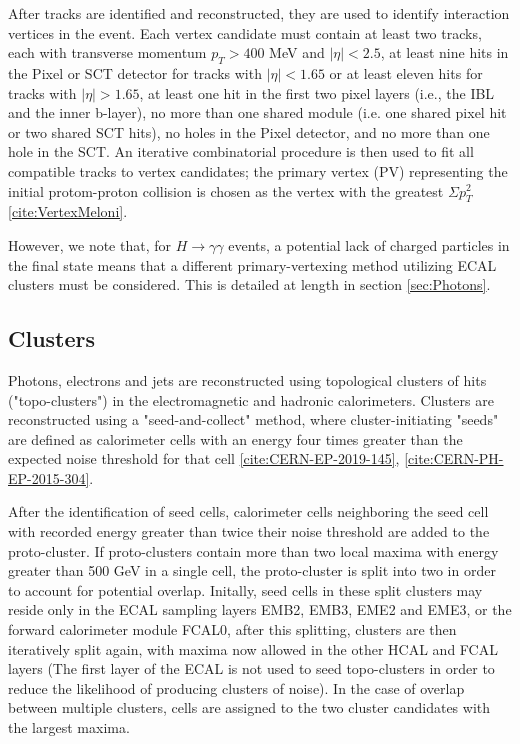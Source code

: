After tracks are identified and reconstructed, they are used to identify interaction vertices in the event. Each vertex candidate must contain at least two tracks, each with transverse momentum $p_{T} > 400$ MeV and $|\eta|<2.5$, at least nine hits in the Pixel or SCT detector for tracks with $|\eta|<1.65$ or at least eleven hits for tracks with $|\eta|>1.65$, at least one hit in the first two pixel layers (i.e., the IBL and the inner b-layer), no more than one shared module (i.e. one shared pixel hit or two shared SCT hits), no holes in the Pixel detector, and no more than one hole in the SCT. An iterative combinatorial procedure is then used to fit all compatible tracks to vertex candidates; the primary vertex (PV) representing the initial protom-proton collision is chosen as the vertex with the greatest $\Sigma p_{T}^{2}$ \ref{cite:VertexMeloni}.

However, we note that, for $H \rightarrow \gamma \gamma$ events, a potential lack of charged particles in the final state means that a different primary-vertexing method utilizing ECAL clusters must be considered. This is detailed at length in section \ref{sec:Photons}.


\subsection{Clusters} \label{sec:Clusters} 

Photons, electrons and jets are reconstructed using topological clusters of hits ("topo-clusters") in the electromagnetic and hadronic calorimeters. Clusters are reconstructed using a "seed-and-collect" method, where cluster-initiating "seeds" are defined as calorimeter cells with an energy four times greater than the expected noise threshold for that cell  \ref{cite:CERN-EP-2019-145}, \ref{cite:CERN-PH-EP-2015-304}.

After the identification of seed cells, calorimeter cells neighboring the seed cell with recorded energy greater than twice their noise threshold are added to the proto-cluster. If proto-clusters contain more than two local maxima with energy greater than 500 GeV in a single cell, the proto-cluster is split into two in order to account for potential overlap. Initally, seed cells in these split clusters may reside only in the ECAL sampling layers EMB2, EMB3, EME2 and EME3, or the forward calorimeter module FCAL0, after this splitting, clusters are then iteratively split again, with maxima now allowed in the other HCAL and FCAL layers (The first layer of the ECAL is not used to seed topo-clusters in order to reduce the likelihood of producing clusters of noise). In the case of overlap between multiple clusters, cells are assigned to the two cluster candidates with the largest maxima.

